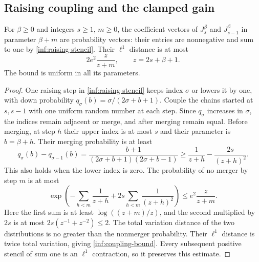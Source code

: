 \subsection{Raising coupling and the clamped gain}

\begin{lemma}\label{inf:raising-coupling}
For $\beta\ge0$ and integers $s\ge1$, $m\ge0$, the coefficient
vectors of $J_s^\beta$ and $J_{s-1}^\beta$ in parameter
$\beta+m$ are probability vectors: their entries are nonnegative
and sum to one by \eqref{inf:raising-stencil}. Their $\ell^1$
distance is at most
\begin{equation}\label{inf:coupling-bound}
 2e^2\frac z{z+m},\qquad z=2s+\beta+1.
\end{equation}
The bound is uniform in all its parameters.
\end{lemma}
\begin{proof}
One raising step in \eqref{inf:raising-stencil} keeps index
$\sigma$ or lowers it by one, with down probability
$q_\sigma(b)=\sigma/(2\sigma+b+1)$.
Couple the chains started at $s,s-1$ with one uniform random
number at each step. Since $q_\sigma$ increases in $\sigma$,
the indices remain adjacent or merge, and after merging remain
equal. Before merging, at step $h$ their upper index is at most
$s$ and their parameter is $b=\beta+h$. Their merging probability
is at least
\[
 q_\sigma(b)-q_{\sigma-1}(b)
 =\frac{b+1}{(2\sigma+b+1)(2\sigma+b-1)}
 \ge\frac1{z+h}-\frac{2s}{(z+h)^2}.
\]
This also holds when the lower index is zero.
The probability of no merger by step $m$ is at most
\[
 \exp\left(-\sum_{h<m}\frac1{z+h}
                     +2s\sum_{h<m}\frac1{(z+h)^2}\right)
 \le e^2\frac z{z+m}.
\]
Here the first sum is at least $\log((z+m)/z)$, and the second
multiplied by $2s$ is at most
$2s(z^{-1}+z^{-2})\le2$.
The total variation distance of the two distributions is no greater
than the nonmerger probability. Their $\ell^1$ distance is twice
total variation, giving \eqref{inf:coupling-bound}.
Every subsequent positive stencil of sum one is an $\ell^1$
contraction, so it preserves this estimate.
\end{proof}

